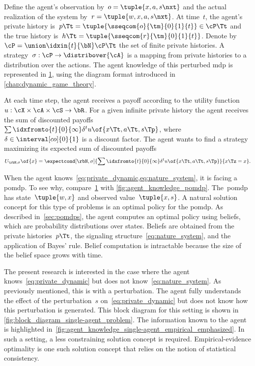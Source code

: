 Define the agent's observation by~\(o = \tuple{x, a, s\nxt}\) and the actual realization of the system by~\(r = \tuple{w, x, a, s\nxt}\).
At time~\(t\), the agent's private history is~\(p\Tt = \tuple{\sseqcom{o}{\tm}{0}{1}{t}} \in \cP\Tt\) and the true history is~\(h\Tt = \tuple{\sseqcom{r}{\tm}{0}{1}{t}}\).
Denote by~\(\cP = \union \idxin{t}{\bN} \cP\Tt\) the set of finite private histories.
A strategy~\(\sigma : \cP \to \distribover{\cA}\) is a mapping from private histories to a distribution over the actions.
The agent knowledge of this perturbed \ac{mdp} is represented in \cref{fig:agent_knowledge_single-agent_empirical}, using the diagram format introduced in \cref{chap:dynamic_game_theory}.

\begin{sidewaysfigure}
\centering
{}
\label{fig:agent_knowledge_single-agent_empirical}
\end{sidewaysfigure}

At each time step, the agent receives a payoff according to the utility function~\(u: \cX \times \cA \times \cS \to \bR\).
For a given infinite private history the agent receives the sum of discounted payoffs~\(\sum\idxfromto{t}{0}{\infty} \delta^t u \of{x\Tt, a\Tt, s\Tp}\), where~\(\delta \in \interval[co]{0}{1}\) is a discount factor.
The agent wants to find a strategy maximizing its expected sum of discounted payoffs
\[U\params{\rbN, \sigma}\of{x} = \expectcond[\rbN, \sigma]{\sum\idxfromto{t}{0}{\infty} \delta^t u \of{x\Tt, a\Tt, s\Tp}}{x\Tz = x}.
\]

When the agent knows~\cref{eq:private_dynamic,eq:nature_system}, it is facing a \ac{pomdp}.
To see why, compare~\cref{fig:agent_knowledge_single-agent_empirical} with \cref{fig:agent_knowledge_pomdp}.
The~\ac{pomdp} has state~\(\tuple{w, x}\) and observed value~\(\tuple{x,s}\).
A natural solution concept for this type of problems is an optimal policy for the \ac{pomdp}.
As described in~\cref{sec:pomdps}, the agent computes an optimal policy using beliefs, which are probability distributions over states.
Beliefs are obtained from the private histories~\(p\Tt\), the signaling structure~\cref{eq:nature_system}, and the application of Bayes' rule.
Belief computation is intractable because the size of the belief space grows with time.

The present research is interested in the case where the agent knows~\cref{eq:private_dynamic} but does not know~\cref{eq:nature_system}.
As previously mentioned, this is  with a perturbation.
The agent fully understands the effect of the perturbation~\(s\) on~\cref{eq:private_dynamic} but does not know how this perturbation is generated.
This block diagram for this setting is shown in \cref{fig:block_diagram_single-agent_problem}.
The information known to the agent is highlighted in~\cref{fig:agent_knowledge_single-agent_empirical_emphasized}.
In such a setting, a less constraining solution concept is required.
Empirical-evidence optimality is one such solution concept that relies on the notion of statistical consistency.

